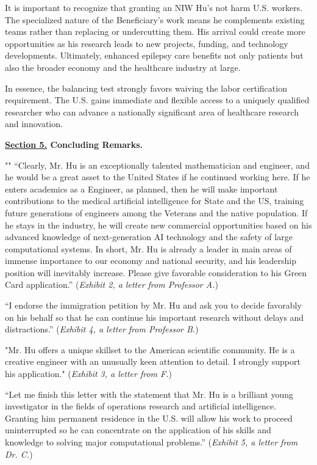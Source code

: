 \documentclass{article}
\begin{document}
It is important to recognize that granting an NIW Hu's not harm U.S. workers. The specialized nature of the Beneficiary’s work means he complements existing teams rather than replacing or undercutting them. His arrival could create more opportunities as his research leads to new projects, funding, and technology developments. Ultimately, enhanced epilepsy care benefits not only patients but also the broader economy and the healthcare industry at large.

In essence, the balancing test strongly favors waiving the labor certification requirement. The U.S. gains immediate and flexible access to a uniquely qualified researcher who can advance a nationally significant area of healthcare research and innovation.

\clearpage

{\bf \underline{Section 5.} Concluding Remarks. }

""
“Clearly, Mr. Hu is an exceptionally talented mathematician and engineer, and he would be a great asset to the United States if he continued working here. If he enters academics as a Engineer, as planned, then he will make important contributions to the medical artificial intelligence for State and the US, training future generations of engineers among the Veterans and the native population. If he stays in the industry, he will create new commercial opportunities based on his advanced knowledge of next-generation AI technology and the safety of large computational systems. In short, Mr. Hu is already a leader in main areas of immense importance to our economy and national security, and his leadership position will inevitably increase. Please give favorable consideration to his Green Card application.” ({\it Exhibit 2, a letter from Professor A.}) 

“I endorse the immigration petition by Mr. Hu and ask you to decide favorably on his behalf so that he can continue his important research without delays and distractions.” ({\it Exhibit 4, a letter from Professor B.}) 

"Mr. Hu offers a unique skillset to the American scientific community. He is a creative engineer with an unusually keen attention to detail. I strongly support his application." ({\it Exhibit 3, a letter from F.}) 

“Let me finish this letter with the statement that Mr. Hu is a brilliant young investigator in the fields of operations research and artificial intelligence. Granting him permanent residence in the U.S. will allow his work to proceed uninterrupted so he can concentrate on the application of his skills and knowledge to solving major computational problems.” ({\it Exhibit 5, a letter from Dr. C.}) 
\end{document}
